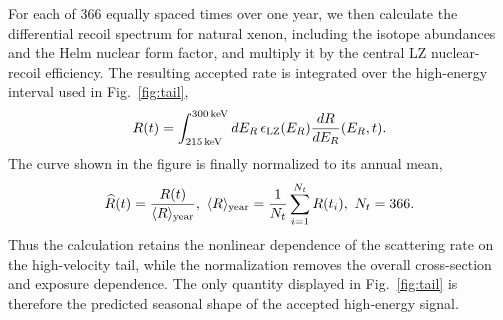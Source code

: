 \documentclass[aps,prd,reprint,superscriptaddress,nofootinbib,longbibliography,floatfix]{revtex4-2}
\begin{document}
For each of 366 equally spaced times over one year, we then calculate the differential recoil spectrum for natural xenon, including the isotope abundances and the Helm nuclear form factor, and multiply it by the central LZ nuclear-recoil efficiency. The resulting accepted rate is integrated over the high-energy interval used in Fig.~\ref{fig:tail},
\begin{equation}
R(t)=
\int_{215\,\mathrm{keV}}^{300\,\mathrm{keV}}
dE_R\,
\epsilon_{\rm LZ}(E_R)
\frac{dR}{dE_R}(E_R,t).
\end{equation}
The curve shown in the figure is finally normalized to its annual mean,
\begin{equation}
\widehat R(t)=\frac{R(t)}
{\langle R\rangle_{\rm year}},
\,\,
\langle R\rangle_{\rm year}
=
\frac{1}{N_t}\sum_{i=1}^{N_t}R(t_i),
\,\,
N_t=366.
\end{equation}
Thus the calculation retains the nonlinear dependence of the scattering rate on the high-velocity tail, while the normalization removes the overall cross-section and exposure dependence. The only quantity displayed in Fig.~\ref{fig:tail} is therefore the predicted seasonal shape of the accepted high-energy signal.
\end{document}
